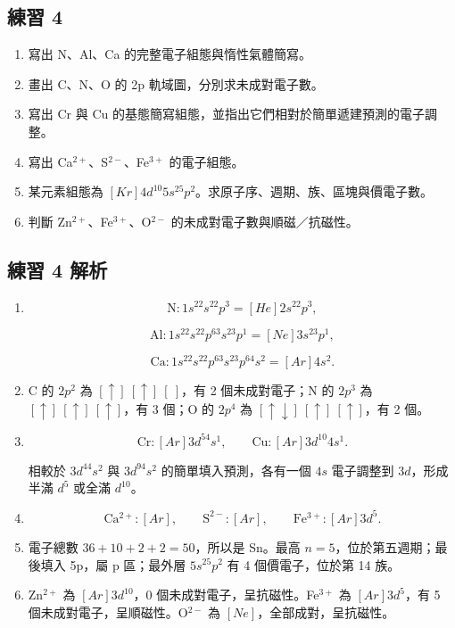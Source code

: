 \documentclass[11pt,a4paper]{article}
\providecommand{\tightlist}{%
  \setlength{\itemsep}{0pt}\setlength{\parskip}{0pt}}
\begin{document}
\subsection{練習 4}\label{ux7df4ux7fd2-4}

\begin{enumerate}
\def\labelenumi{\arabic{enumi}.}
\tightlist
\item
  寫出 N、Al、Ca 的完整電子組態與惰性氣體簡寫。
\item
  畫出 C、N、O 的 2p 軌域圖，分別求未成對電子數。
\item
  寫出 Cr 與 Cu 的基態簡寫組態，並指出它們相對於簡單遞建預測的電子調整。
\item
  寫出 Ca\(^{2+}\)、S\(^{2-}\)、Fe\(^{3+}\) 的電子組態。
\item
  某元素組態為 \([Kr]4d^{10}5s^25p^2\)。求原子序、週期、族、區塊與價電子數。
\item
  判斷 Zn\(^{2+}\)、Fe\(^{3+}\)、O\(^{2-}\) 的未成對電子數與順磁／抗磁性。
\end{enumerate}

\subsection{練習 4 解析}\label{ux7df4ux7fd2-4-ux89e3ux6790}

\begin{enumerate}
\def\labelenumi{\arabic{enumi}.}
\item
  \[
  \mathrm N:1s^22s^22p^3=[He]2s^22p^3,
  \]

  \[
  \mathrm{Al}:1s^22s^22p^63s^23p^1=[Ne]3s^23p^1,
  \]

  \[
  \mathrm{Ca}:1s^22s^22p^63s^23p^64s^2=[Ar]4s^2.
  \]
\item
  C 的 \(2p^2\) 為 \([\uparrow]\ [\uparrow]\ [\ ]\)，有 2 個未成對電子；N 的 \(2p^3\) 為 \([\uparrow]\ [\uparrow]\ [\uparrow]\)，有 3 個；O 的 \(2p^4\) 為 \([\uparrow\downarrow]\ [\uparrow]\ [\uparrow]\)，有 2 個。
\item
  \[
  \mathrm{Cr}:[Ar]3d^54s^1,
  \qquad
  \mathrm{Cu}:[Ar]3d^{10}4s^1.
  \]

  相較於 \(3d^44s^2\) 與 \(3d^94s^2\) 的簡單填入預測，各有一個 \(4s\) 電子調整到 \(3d\)，形成半滿 \(d^5\) 或全滿 \(d^{10}\)。
\item
  \[
  \mathrm{Ca^{2+}}:[Ar],\qquad
  \mathrm{S^{2-}}:[Ar],\qquad
  \mathrm{Fe^{3+}}:[Ar]3d^5.
  \]
\item
  電子總數 \(36+10+2+2=50\)，所以是 Sn。最高 \(n=5\)，位於第五週期；最後填入 5p，屬 p 區；最外層 \(5s^25p^2\) 有 4 個價電子，位於第 14 族。
\item
  Zn\(^{2+}\) 為 \([Ar]3d^{10}\)，0 個未成對電子，呈抗磁性。Fe\(^{3+}\) 為 \([Ar]3d^5\)，有 5 個未成對電子，呈順磁性。O\(^{2-}\) 為 \([Ne]\)，全部成對，呈抗磁性。
\end{enumerate}
\end{document}
